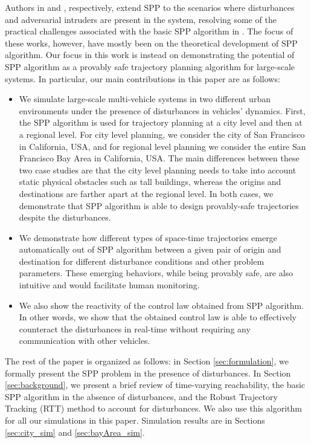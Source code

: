 Authors in \cite{Bansal2017} and \cite{chen2016robust}, respectively, extend SPP to the scenarios where disturbances and adversarial intruders are present in the system, resolving some of the practical challenges associated with the basic SPP algorithm in \cite{Chen15c}. The focus of these works, however, have mostly been on the theoretical development of SPP algorithm. Our focus in this work is instead on demonstrating the potential of SPP algorithm as a provably safe trajectory planning algorithm for large-scale systems. In particular, our main contributions in this paper are as follows:
\begin{itemize}
\item We simulate large-scale multi-vehicle systems in two different urban environments under the presence of disturbances in vehicles' dynamics. First, the SPP algorithm is used for trajectory planning at a city level and then at a regional level. For city level planning, we consider the city of San Francisco in California, USA, and for regional level planning we consider the entire San Francisco Bay Area in California, USA. The main differences between these two case studies are that the city level planning needs to take into account static physical obstacles such as tall buildings, whereas the origins and destinations are farther apart at the regional level. In both cases, we demonstrate that SPP algorithm is able to design provably-safe trajectories despite the disturbances.
\item We demonstrate how different types of space-time trajectories emerge automatically out of SPP algorithm between a given pair of origin and destination for different disturbance conditions and other problem parameters. These emerging behaviors, while being provably safe, are also intuitive and would facilitate human monitoring. 
\item We also show the reactivity of the control law obtained from SPP algorithm. In other words, we show that the obtained control law is able to effectively counteract the disturbances in real-time without requiring any communication with other vehicles.
\end{itemize}

The rest of the paper is organized as follows: in Section \ref{sec:formulation}, we formally present the SPP problem in the presence of disturbances. In Section \ref{sec:background}, we present a brief review of time-varying reachability, the basic SPP algorithm \cite{Chen15c} in the absence of disturbances, and the Robust Trajectory Tracking (RTT) method \cite{Bansal2017} to account for disturbances. We also use this algorithm for all our simulations in this paper. Simulation results are in Sections \ref{sec:city_sim} and \ref{sec:bayArea_sim}.